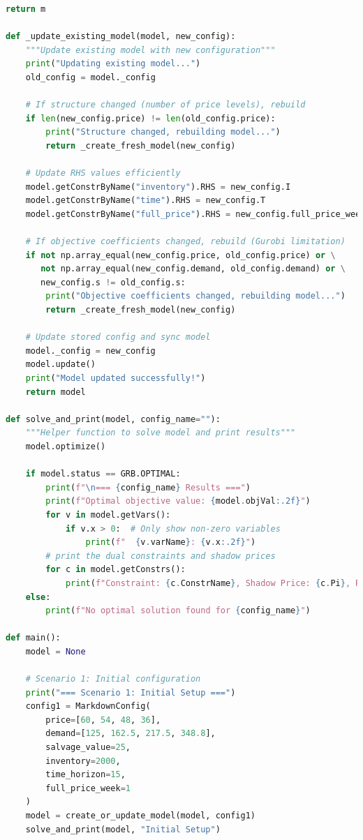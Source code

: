 \documentclass[12pt]{article}
\begin{document}
\begin{lstlisting}[language=Python, caption={Markdown Management Python Code}]
    return m

def _update_existing_model(model, new_config):
    """Update existing model with new configuration"""
    print("Updating existing model...")
    old_config = model._config
    
    # If structure changed (number of price levels), rebuild
    if len(new_config.price) != len(old_config.price):
        print("Structure changed, rebuilding model...")
        return _create_fresh_model(new_config)
    
    # Update RHS values efficiently
    model.getConstrByName("inventory").RHS = new_config.I
    model.getConstrByName("time").RHS = new_config.T
    model.getConstrByName("full_price").RHS = new_config.full_price_week
    
    # If objective coefficients changed, rebuild (Gurobi limitation)
    if not np.array_equal(new_config.price, old_config.price) or \
       not np.array_equal(new_config.demand, old_config.demand) or \
       new_config.s != old_config.s:
        print("Objective coefficients changed, rebuilding model...")
        return _create_fresh_model(new_config)
    
    # Update stored config and sync model
    model._config = new_config
    model.update()
    print("Model updated successfully!")
    return model

def solve_and_print(model, config_name=""):
    """Helper function to solve model and print results"""
    model.optimize()
    
    if model.status == GRB.OPTIMAL:
        print(f"\n=== {config_name} Results ===")
        print(f"Optimal objective value: {model.objVal:.2f}")
        for v in model.getVars():
            if v.x > 0:  # Only show non-zero variables
                print(f"  {v.varName}: {v.x:.2f}")
        # print the dual constraints and shadow prices
        for c in model.getConstrs():
            print(f"Constraint: {c.ConstrName}, Shadow Price: {c.Pi}, Range: [{c.SARHSLow}, {c.SARHSUp}]")
    else:
        print(f"No optimal solution found for {config_name}")

def main():
    model = None
    
    # Scenario 1: Initial configuration
    print("=== Scenario 1: Initial Setup ===")
    config1 = MarkdownConfig(
        price=[60, 54, 48, 36],
        demand=[125, 162.5, 217.5, 348.8],
        salvage_value=25,
        inventory=2000,
        time_horizon=15,
        full_price_week=1
    )
    model = create_or_update_model(model, config1)
    solve_and_print(model, "Initial Setup")
    

\end{lstlisting}
\end{document}
